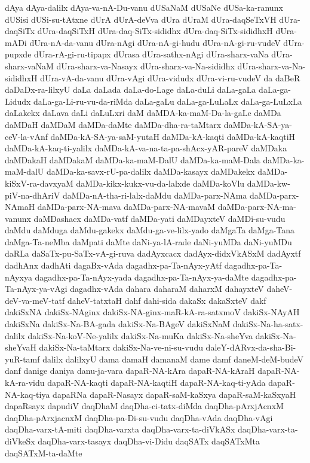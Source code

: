 {dAya
dAya-dalilx
dAya-va-nA-Du-vanu
dUSaNaM
dUSaNe
dUSa-ka-ranunx
dUSisi
dUSi-su-tAtxne
dUrA
dUrA-deVva
dUra
dUraM
dUra-daqSeTxVH
dUra-daqSiTx
dUra-daqSiTxH
dUra-daq-SiTx-sididhx
dUra-daq-SiTx-sididhxH
dUra-mADi
dUra-nA-da-vanu
dUra-nAgi
dUra-nA-gi-hudu
dUra-nA-gi-ru-vudeV
dUra-pupxde
dUra-rA-gi-ru-tipapx
dUrasa
dUra-sathx-nAgi
dUra-sharx-vaNa
dUra-sharx-vaNaM
dUra-sharx-va-Nasayx
dUra-sharx-va-Na-sididhx
dUra-sharx-va-Na-sididhxH
dUra-vA-da-vanu
dUra-vAgi
dUra-vidudx
dUra-vi-ru-vudeV
da
daBeR
daDaDx-ra-lilxyU
daLa
daLada
daLa-do-Lage
daLa-duLi
daLa-gaLa
daLa-ga-Lidudx
daLa-ga-Li-ru-vu-da-riMda
daLa-gaLu
daLa-ga-LuLaLx
daLa-ga-LuLxLa
daLakekx
daLava
daLi
daLuLxri
daM
daMDA-ka-maM-Da-la-gaLe
daMDa
daMDaH
daMDaM
daMDa-daMte
daMDa-dha-ra-taMtarx
daMDa-kA-SA-ya-ceV-la-vAnf
daMDa-kA-SA-ya-saM-yutaH
daMDa-kA-kaqti
daMDa-kA-kaqtiH
daMDa-kA-kaq-ti-yalilx
daMDa-kA-va-na-ta-pa-shAcx-yAR-pareV
daMDaka
daMDakaH
daMDakaM
daMDa-ka-maM-DalU
daMDa-ka-maM-Dala
daMDa-ka-maM-dalU
daMDa-ka-savx-rU-pa-dalilx
daMDa-kasayx
daMDakekx
daMDa-kiSxV-ra-davxyaM
daMDa-kikx-kukx-vu-da-lalxde
daMDa-koVlu
daMDa-kw-piV-na-dhAriV
daMDa-nA-tha-ri-lalx-daMdu
daMDa-parx-NAma
daMDa-parx-NAmaH
daMDa-parx-NA-mava
daMDa-parx-NA-mavaM
daMDa-parx-NA-ma-vanunx
daMDashacx
daMDa-vatf
daMDa-yati
daMDayxteV
daMDi-su-vudu
daMdu
daMduga
daMdu-gakekx
daMdu-ga-ve-lilx-yado
daMgaTa
daMga-Tana
daMga-Ta-neMba
daMpati
daMte
daNi-ya-lA-rade
daNi-yuMDa
daNi-yuMDu
daRLa
daSaTx-pu-SaTx-vA-gi-ruva
dadAyxcacx
dadAyx-didxVkASxM
dadAyxtf
dadhAnx
dadhAti
dagaBx-vAda
dagadhx-pa-Ta-nAyx-yAtf
dagadhx-pa-Ta-nAyxya
dagadhx-pa-Ta-nAyx-yada
dagadhx-pa-Ta-nAyx-ya-daMte
dagadhx-pa-Ta-nAyx-ya-vAgi
dagadhx-vAda
dahara
daharaM
daharxM
dahayxteV
daheV-deV-va-meV-tatf
daheV-tatxtaH
dahf
dahi-sida
dakaSx
dakaSxteV
dakf
dakiSxNA
dakiSx-NAginx
dakiSx-NA-ginx-maR-kA-ra-satxmoV
dakiSx-NAyAH
dakiSxNa
dakiSx-Na-BA-gada
dakiSx-Na-BAgeV
dakiSxNaM
dakiSx-Na-ha-satx-dalilx
dakiSx-Na-koV-Ne-yalilx
dakiSx-Na-muKa
dakiSx-Na-sheYva
dakiSx-Na-sheYvaH
dakiSx-Na-taMtarx
dakiSx-Na-ve-ni-su-vudu
daleY-dARvx-da-sha-Bi-yuR-tamf
dalilx
dalilxyU
dama
damaH
damanaM
dame
damf
daneM-deM-budeV
danf
danige
daniya
danu-ja-vara
dapaR-NA-kAra
dapaR-NA-kAraH
dapaR-NA-kA-ra-vidu
dapaR-NA-kaqti
dapaR-NA-kaqtiH
dapaR-NA-kaq-ti-yAda
dapaR-NA-kaq-tiya
dapaRNa
dapaR-Nasayx
dapaR-saM-kaSxya
dapaR-saM-kaSxyaH
dapaRsayx
dapudiV
daqDhaM
daqDha-ci-tatx-diMda
daqDha-pArxjAcnxM
daqDha-pArxjacnxM
daqDha-pa-Di-su-vudu
daqDha-vAda
daqDha-vAgi
daqDha-varx-tA-miti
daqDha-varxta
daqDha-varx-ta-diVkASx
daqDha-varx-ta-diVkeSx
daqDha-varx-tasayx
daqDha-vi-Didu
daqSATx
daqSATxMta
daqSATxM-ta-daMte
}

